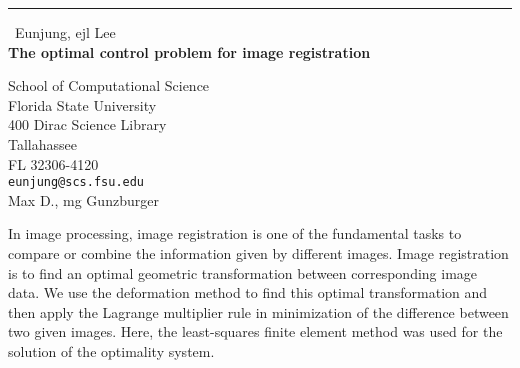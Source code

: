 \documentclass{report}
\begin{document}
\begin{center}
\rule{6in}{1pt} \
{\large Eunjung, ejl Lee \\
{\bf The optimal control problem for image registration}}

School of Computational Science \\ Florida State University \\ 400 Dirac Science Library \\ Tallahassee \\ FL 32306-4120
\\
{\tt eunjung@scs.fsu.edu}\\
Max D., mg Gunzburger\end{center}

In image processing, image registration is one of the fundamental tasks
to compare or combine the information given by different images. Image
registration is to find an optimal geometric transformation between
corresponding image data. We use the deformation method to find this
optimal transformation and then apply the Lagrange multiplier rule in
minimization of the difference between two given images. Here, the
least-squares finite element method was used for the solution of the
optimality system.
\end{document}
